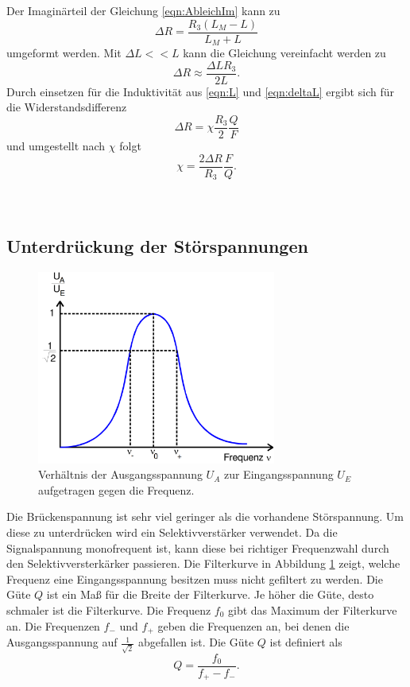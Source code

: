 Der Imaginärteil der Gleichung \eqref{eqn:AbleichIm} kann zu 
\begin{equation}
    ΔR = \frac{R_3(L_M - L)}{L_M + L}
\end{equation}
umgeformt werden. Mit $ΔL << L$ kann die Gleichung vereinfacht werden zu
\begin{equation*}
    ΔR \approx \frac{ΔLR_3}{2L}.
\end{equation*}
Durch einsetzen für die Induktivität aus \eqref{eqn:L} und \eqref{eqn:deltaL} ergibt sich für die Widerstandsdifferenz
\begin{equation*}
    ΔR = χ\frac{R_3}{2} \frac{Q}{F}
\end{equation*}
und umgestellt nach $χ$ folgt
\begin{equation}\label{eqn:chi3}
    χ = \frac{2ΔR}{R_3} \frac{F}{Q}.
\end{equation}
\\
\\
\subsection{Unterdrückung der Störspannungen}

\begin{figure}[H]
    \centering
    \includegraphics[width=0.7\textwidth]{img/Filterkurve.png}
    \caption{Verhältnis der Ausgangsspannung $U_A$ zur Eingangsspannung $U_E$ aufgetragen gegen die Frequenz\cite{V606}.}
    \label{fig:Filterkurve}
\end{figure}

Die Brückenspannung ist sehr viel geringer als die vorhandene Störspannung. 
Um diese zu unterdrücken wird ein Selektivverstärker verwendet.
Da die Signalspannung monofrequent ist, kann diese bei richtiger Frequenzwahl durch den Selektivversterkärker passieren.
Die Filterkurve in Abbildung \ref{fig:Filterkurve} zeigt, welche Frequenz eine Eingangsspannung besitzen muss nicht gefiltert zu werden.
Die Güte $Q$ ist ein Maß für die Breite der Filterkurve. Je höher die Güte, desto schmaler ist die Filterkurve.
Die Frequenz $f_0$ gibt das Maximum der Filterkurve an. Die Frequenzen $f_-$ und $f_+$ geben die Frequenzen an, bei denen die Ausgangsspannung auf $\frac{1}{\sqrt{2}}$ abgefallen ist.
Die Güte $Q$ ist definiert als
\begin{equation}\label{eqn:gute}
    Q = \frac{f_0}{f_+ - f_-}.
\end{equation}
